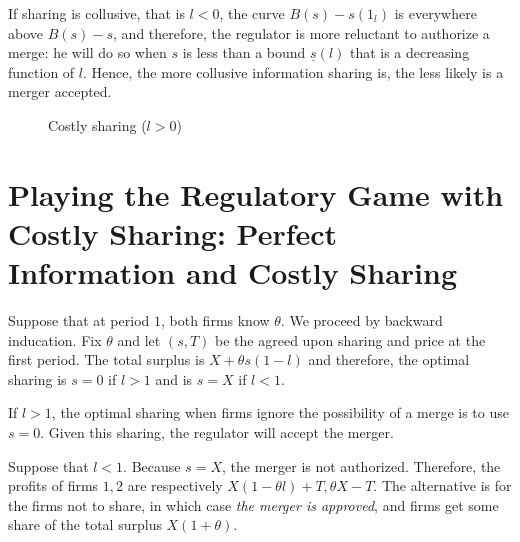 \documentclass[a4paper]{article}
\renewcommand{\t}{\theta}
\begin{document}
If sharing is collusive, that is $l<0$, the curve $B(s)-s(1_l)$ is everywhere above $B(s)-s$, and therefore, the regulator is more reluctant to authorize a merge: he will do so when $s$ is less than a bound $\underline s(l)$ that is a decreasing function of $l$. Hence, the more collusive information sharing is, the less likely is a merger accepted.

\begin{figure}[h!]
    \centering
    \caption{Costly sharing ($l>0$)}
    \label{fig:l>0}
\end{figure}


\section{Playing the Regulatory Game with Costly Sharing: Perfect Information and Costly Sharing}
Suppose that at period $1$, both firms know $\theta$. We proceed by backward inducation. Fix $\t$ and let $(s,T)$ be the agreed upon sharing and price at the first period. The total surplus is $X+\t s(1-l)$ and therefore, the optimal sharing is $s=0$ if $l> 1$ and is $s=X$ if $l<1$. 

If $l>1$, the optimal sharing when firms ignore the possibility of a merge is to use $s=0$. Given this sharing, the regulator will accept the merger.  

Suppose that $l<1$. Because $s=X$, the merger is not authorized. Therefore, the profits of firms $1,2$ are respectively $X(1-\t l)+T,\t X -T$. The alternative is for the firms not to share, in which case \emph{the merger is approved}, and firms get some share of the total surplus $X(1+\t)$. 




\end{document}
